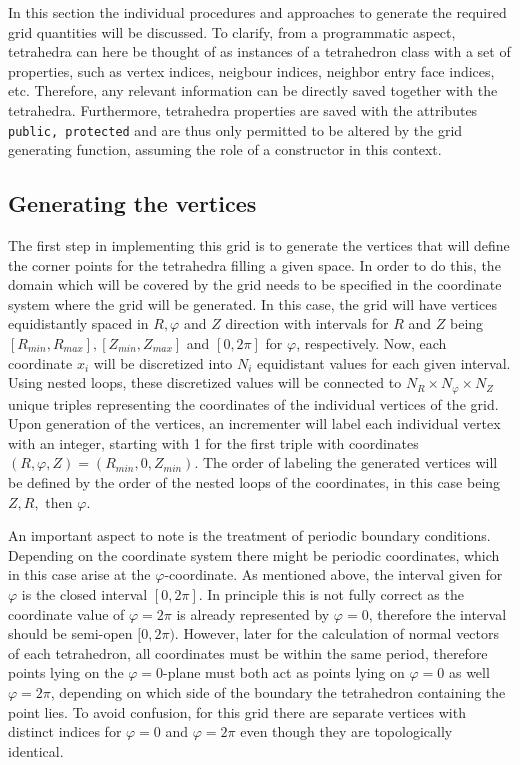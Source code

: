 \documentclass[./main.tex]{subfiles}
\begin{document}
In this section the individual procedures and approaches to generate the required grid quantities will be discussed. To clarify, from a programmatic aspect, tetrahedra can here be thought of as instances of a tetrahedron class with a set of properties, such as vertex indices, neigbour indices, neighbor entry face indices, etc. Therefore, any relevant information can be directly saved together with the tetrahedra. Furthermore, tetrahedra properties are saved with the attributes \texttt{public, protected} and are thus only permitted to be altered by the grid generating function, assuming the role of a constructor in this context.


\subsection{Generating the vertices}
The first step in implementing this grid is to generate the vertices that will define the corner points for the tetrahedra filling a given space. In order to do this, the domain which will be covered by the grid needs to be specified in the coordinate system where the grid will be generated. In this case, the grid will have vertices equidistantly spaced in $R,\varphi$ and $Z$ direction with intervals for $R$ and $Z$ being $[R_{min},R_{max}], [Z_{min},Z_{max}]$ and $[0,2\pi]$ for $\varphi$, respectively. Now, each coordinate $x_i$ will be discretized into $N_i$ equidistant values for each given interval. Using nested loops, these discretized values will be connected to $N_R\times N_\varphi\times N_Z$ unique triples representing the coordinates of the individual vertices of the grid. Upon generation of the vertices, an incrementer will label each individual vertex with an integer, starting with 1 for the first triple with coordinates$(R,\varphi,Z) = (R_{min},0,Z_{min})$. The order of labeling the generated vertices will be defined by the order of the nested loops of the coordinates, in this case being $Z,R,$ then $\varphi$. 

An important aspect to note is the treatment of periodic boundary conditions. Depending on the coordinate system there might be periodic coordinates, which in this case arise at the $\varphi$-coordinate. As mentioned above, the interval given for $\varphi$ is the closed interval $[0,2\pi]$. In principle this is not fully correct as the coordinate value of $\varphi=2\pi$ is already represented by $\varphi=0$, therefore the interval should be semi-open $[0,2\pi)$. However, later for the calculation of normal vectors of each tetrahedron, all coordinates must be within the same period, therefore points lying on the $\varphi=0$-plane must both act as points lying on $\varphi=0$ as well $\varphi=2\pi$, depending on which side of the boundary the tetrahedron containing the point lies. To avoid confusion, for this grid there are separate vertices with distinct indices for $\varphi=0$ and $\varphi=2\pi$ even though they are topologically identical. 
\end{document}
